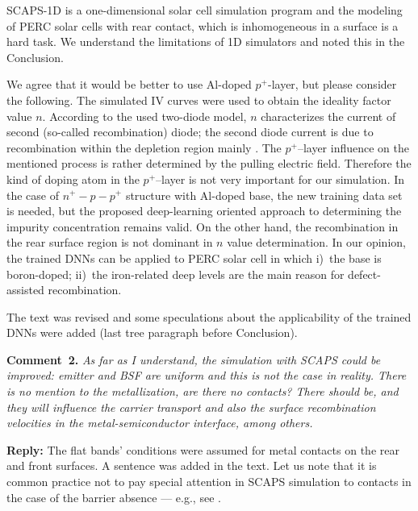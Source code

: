 \documentclass[num-refs]{wiley-article} %
\begin{document}
SCAPS-1D is a one-dimensional solar cell simulation program and
the modeling of PERC solar cells with rear contact, which is
inhomogeneous in a surface is a hard task.
We understand the limitations of 1D simulators and noted this in the Conclusion.

We agree that it would be better to use Al-doped $p^+$-layer, but please consider the following.
The simulated IV curves were used to obtain the ideality factor value $n$.
According to the used two-diode model,
$n$ characterizes the current of second (so-called recombination)  diode;
the second diode current is due to recombination within
the depletion region mainly \citep{Breitenstein2013,n2McIntosh}.
The $p^+$--layer influence on the mentioned process is rather determined by
the pulling electric field.
Therefore the kind of doping atom in the $p^+$--layer is not very important for our simulation.
In the case of $n^+-p-p^+$ structure with Al-doped base, the new training data set is needed,
but the proposed deep-learning oriented approach to determining the impurity concentration remains valid.
On the other hand, the recombination in the rear surface region is not dominant
in $n$ value determination.
In our opinion, the trained DNNs can be applied to PERC solar cell in which
i)~the base is boron-doped;
ii)~the iron-related deep levels are the main reason for defect-assisted recombination.


The text was revised and some speculations about the applicability of the trained DNNs were added (last tree paragraph before Conclusion).


\vspace{1cm}
\noindent
\textcolor[rgb]{0.00,0.50,1.00}{\textbf{Comment~2.}}
\emph{As far as I understand, the simulation with SCAPS could be improved: emitter and BSF are uniform and this is not the case in reality.
There is no mention to the metallization, are there no contacts?
There should be, and they will influence the carrier transport and also the surface recombination velocities in the metal-semiconductor interface, among others.}

\vspace{0.5cm}
\noindent
\textcolor[rgb]{0.51,0.00,0.00}{\textbf{Reply:}}
The flat bands' conditions were assumed for metal contacts on the rear and
front surfaces.
A sentence was added in the text.
Let us note that it is common practice not to pay special attention in SCAPS simulation
to contacts in the case of
the barrier absence --- e.g., see \cite{SCAPSuseSi4,SCAPSuseSi1,SCAPSuse1,SCAPSuse5,ScapsUse10}.
\end{document}
